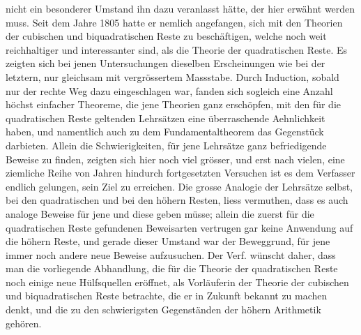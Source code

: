 %
nicht ein besonderer Umstand ihn dazu veranlasst hätte, der hier erwähnt werden muss. Seit dem Jahre 1805 hatte er nemlich angefangen, sich mit den Theorien der cubischen und biquadratischen Reste zu beschäftigen, welche noch weit reichhaltiger und interessanter sind, als die Theorie der quadratischen Reste. Es zeigten sich bei jenen Untersuchungen dieselben Erscheinungen wie bei der letztern, nur gleichsam mit vergrössertem Massstabe. Durch Induction, sobald nur der rechte Weg dazu eingeschlagen war, fanden sich sogleich eine Anzahl höchst einfacher Theoreme, die jene Theorien ganz erschöpfen, mit den für die quadratischen Reste geltenden Lehrsätzen eine überraschende Aehnlichkeit haben, und namentlich auch zu dem Fundamentaltheorem das Gegenstück darbieten. Allein die Schwierigkeiten, für jene Lehrsätze ganz befriedigende Beweise zu finden, zeigten sich hier noch viel grösser, und erst nach vielen, eine ziemliche Reihe von Jahren hindurch fortgesetzten Versuchen ist es dem Verfasser endlich gelungen, sein Ziel zu erreichen. Die grosse Analogie der Lehrsätze selbst, bei den quadratischen und bei den höhern Resten, liess vermuthen, dass es auch analoge Beweise für jene und diese geben müsse; allein die zuerst für die quadratischen Reste gefundenen Beweisarten vertrugen gar keine Anwendung auf die höhern Reste, und gerade dieser Umstand war der Beweggrund, für jene immer noch andere neue Beweise aufzusuchen. Der Verf. wünscht daher, dass man die vorliegende Abhandlung, die für die Theorie der quadratischen Reste noch einige neue Hülfsquellen eröffnet, als Vorläuferin der Theorie der cubischen und biquadratischen Reste betrachte, die er in Zukunft bekannt zu machen denkt, und die zu den schwierigsten Gegenständen der höhern Arithmetik gehören.

